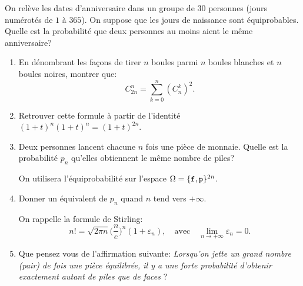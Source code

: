 \documentclass[a4paper,11pt,reqno]{amsart}
\begin{document}
\begin{exo}

  On relève les dates d'anniversaire dans un groupe de $30$ personnes (jours numérotés de $1$ à $365$). On suppose que les jours de naissance sont équiprobables. Quelle est la probabilité que deux personnes au moins aient le même anniversaire?

\end{exo}


\begin{exo}

  \begin{enumerate}
    \item En dénombrant les façons de tirer $n$ boules parmi $n$ boules blanches et $n$ boules noires, montrer que:
      $$
        C_{2n}^n=\sum_{k=0}^n (C_n^k)^2.
      $$

    \item Retrouver cette formule à partir de l'identité $(1+t)^n(1+t)^n=(1+t)^{2n}$.
    \item Deux personnes lancent chacune $n$ fois une pièce de monnaie. Quelle est la probabilité $p_n$ qu'elles obtiennent le même nombre de piles?

    \begin{indication}
      On utilisera l'équiprobabilité sur l'espace $\Omega=\{{\tt f}, {\tt p}\}^{2n}$.
    \end{indication}

    \item Donner un équivalent de $p_n$ quand $n$ tend vers $+\infty$.

    \begin{indication}
      On rappelle la formule de Stirling:
        $$
          n!=\sqrt{2\pi n}\Big(\frac{n}{e}\Big)^{n}(1+\varepsilon_n),\quad\text{avec}\quad \lim_{n\to +\infty} \varepsilon_n=0.
        $$
    \end{indication}\hspace{-\baselineskip}

    \item Que pensez vous de l'affirmation suivante: \emph{Lorsqu'on jette un grand nombre (pair) de fois une pièce équilibrée, il y a une forte probabilité d'obtenir exactement autant de piles que de faces} ?
  \end{enumerate}

\end{exo}
\end{document}
